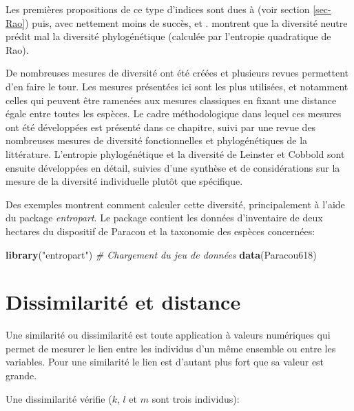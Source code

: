 \documentclass[
  11pt,
  french,
  a4paper,
  extrafontsizes,onecolumn,openright
  ]{memoir}
\newenvironment{Shaded}{\begin{snugshade}}{\end{snugshade}}
\newcommand{\CommentTok}[1]{\textcolor[rgb]{0.56,0.35,0.01}{\textit{#1}}}
\newcommand{\FunctionTok}[1]{\textcolor[rgb]{0.13,0.29,0.53}{\textbf{#1}}}
\newcommand{\NormalTok}[1]{#1}
\newcommand{\StringTok}[1]{\textcolor[rgb]{0.31,0.60,0.02}{#1}}
\begin{document}
Les premières propositions de ce type d'indices sont dues à \textcite{Rao1982} (voir section \ref{sec-Rao}) puis, avec nettement moins de succès, \textcite{Vane-Wright1991} et \textcite{Warwick1995}.
\textcite{Chave2007} montrent que la diversité neutre prédit mal la diversité phylogénétique (calculée par l'entropie quadratique de Rao).

De nombreuses mesures de diversité ont été créées et plusieurs revues permettent d'en faire le tour. \autocite{Ricotta2007,Vellend2010}
Les mesures présentées ici sont les plus utilisées, et notamment celles qui peuvent être ramenées aux mesures classiques en fixant une distance égale entre toutes les espèces.
Le cadre méthodologique dans lequel ces mesures ont été développées est présenté dans ce chapitre, suivi par une revue des nombreuses mesures de diversité fonctionnelles et phylogénétiques de la littérature.
L'entropie phylogénétique et la diversité de Leinster et Cobbold sont ensuite développées en détail, suivies d'une synthèse et de considérations sur la mesure de la diversité individuelle plutôt que spécifique.

Des exemples montrent comment calculer cette diversité, principalement à l'aide du package \emph{entropart}.
Le package contient les données d'inventaire de deux hectares du dispositif de Paracou et la taxonomie des espèces concernées:

\scriptsize

\begin{Shaded}
\begin{Highlighting}[]
\FunctionTok{library}\NormalTok{(}\StringTok{"entropart"}\NormalTok{)}
\CommentTok{\# Chargement du jeu de données}
\FunctionTok{data}\NormalTok{(Paracou618)}
\end{Highlighting}
\end{Shaded}

\normalsize

\section{Dissimilarité et distance}\label{dissimilarituxe9-et-distance}

Une similarité ou dissimilarité est toute application à valeurs numériques qui permet de mesurer le lien entre les individus d'un même ensemble ou entre les variables.
Pour une similarité le lien est d'autant plus fort que sa valeur est grande.

Une dissimilarité vérifie (\(k\), \(l\) et \(m\) sont trois individus):
\end{document}
